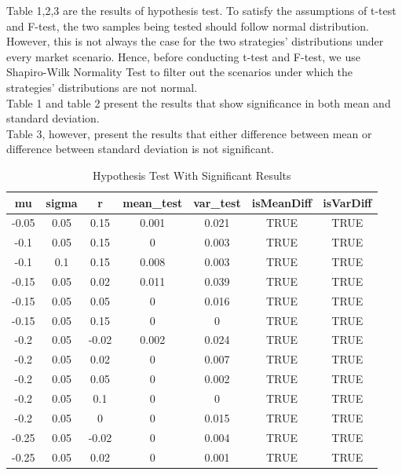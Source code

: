 \documentclass[
10pt, %
a4paper, %
oneside, %
headinclude,footinclude, %
BCOR5mm, %
]{scrartcl}
\begin{document}
Table 1,2,3 are the results of hypothesis test. To satisfy the assumptions of t-test and F-test, the two samples being tested should follow normal distribution. However, this is not always the case for the two strategies' distributions under every market scenario. Hence, before conducting t-test and F-test, we use Shapiro-Wilk Normality Test to filter out the scenarios under which the strategies' distributions are not normal.\\

Table 1 and table 2 present the results that show significance in both mean and standard deviation.\\

Table 3, however, present the results that either difference between mean or difference between standard deviation is not significant.
\begin{table}[H]
	\centering
	\caption{Hypothesis Test With Significant Results}
	\label{my-label}
	\begin{tabular}{|c|c|c|c|c|c|c|}
		\hline
		mu    & sigma & r     & mean\_test & var\_test & isMeanDiff & isVarDiff \\
		\hline
		-0.05 & 0.05  & 0.15  & 0.001      & 0.021     & TRUE       & TRUE      \\
		-0.1  & 0.05  & 0.15  & 0          & 0.003     & TRUE       & TRUE      \\
		-0.1  & 0.1   & 0.15  & 0.008      & 0.003     & TRUE       & TRUE      \\
		-0.15 & 0.05  & 0.02  & 0.011      & 0.039     & TRUE       & TRUE      \\
		-0.15 & 0.05  & 0.05  & 0          & 0.016     & TRUE       & TRUE      \\
		-0.15 & 0.05  & 0.15  & 0          & 0         & TRUE       & TRUE      \\
		-0.2  & 0.05  & -0.02 & 0.002      & 0.024     & TRUE       & TRUE      \\
		-0.2  & 0.05  & 0.02  & 0          & 0.007     & TRUE       & TRUE      \\
		-0.2  & 0.05  & 0.05  & 0          & 0.002     & TRUE       & TRUE      \\
		-0.2  & 0.05  & 0.1   & 0          & 0         & TRUE       & TRUE      \\
		-0.2  & 0.05  & 0     & 0          & 0.015     & TRUE       & TRUE      \\
		-0.25 & 0.05  & -0.02 & 0          & 0.004     & TRUE       & TRUE      \\
		-0.25 & 0.05  & 0.02  & 0          & 0.001     & TRUE       & TRUE      \\

\end{tabular}
\end{table}
\end{document}
